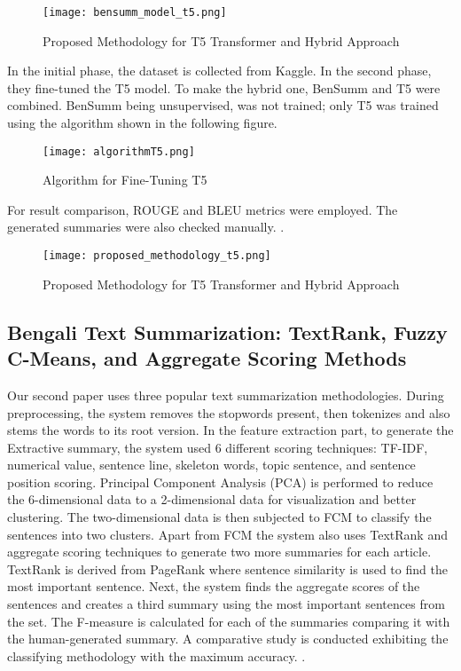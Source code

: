 \documentclass[12pt]{report}
\begin{document}
\begin{figure}[H]
    \centering
    \texttt{[image: bensumm\_model\_t5.png]}
    \caption{Proposed Methodology for T5 Transformer and Hybrid Approach \cite{hasib2023bengali}}
    \label{fig:t5_bensumm}
\end{figure}

In the initial phase, the dataset is collected from Kaggle. In the second phase, they fine-tuned the T5 model. To make the hybrid one, BenSumm and T5 were combined. BenSumm being unsupervised, was not trained; only T5 was trained using the algorithm shown in the following figure. 

\begin{figure}[H]
    \centering
    \texttt{[image: algorithmT5.png]}
    \caption{Algorithm for Fine-Tuning T5 \cite{hasib2023bengali}}
    \label{fig:t5_algorithm}
\end{figure}

For result comparison, ROUGE and BLEU metrics were employed. The generated summaries were also checked manually. 
\cite{hasib2023bengali}.

\begin{figure}[H]
    \centering
    \texttt{[image: proposed\_methodology\_t5.png]}
    \caption{Proposed Methodology for T5 Transformer and Hybrid Approach \cite{hasib2023bengali}}
    \label{fig:t5_transformer_architecture}
\end{figure}

\subsection*{Bengali Text Summarization: TextRank, Fuzzy C-Means, and Aggregate Scoring Methods}
Our second paper uses three popular text summarization methodologies. During preprocessing, the system removes the stopwords present, then tokenizes and also stems the words to its root version. In the feature extraction part, to generate the Extractive summary, the system used 6 different scoring techniques: TF-IDF, numerical value, sentence line, skeleton words, topic sentence, and sentence position scoring. Principal Component Analysis (PCA) is performed to reduce the 6-dimensional data to a 2-dimensional data for visualization and better clustering. The two-dimensional data is then subjected to FCM to classify the sentences into two clusters. 
Apart from FCM the system also uses TextRank and aggregate scoring techniques to generate two more summaries for each article. TextRank is derived from PageRank where sentence similarity is used to find the most important sentence. Next, the system finds the aggregate scores of the sentences and creates a third summary using the most important sentences from the set. The F-measure is calculated for each of the summaries comparing it with the human-generated summary. A comparative study is conducted exhibiting the classifying methodology with the maximum accuracy.
\cite{rahman2019bengali}.
\end{document}
